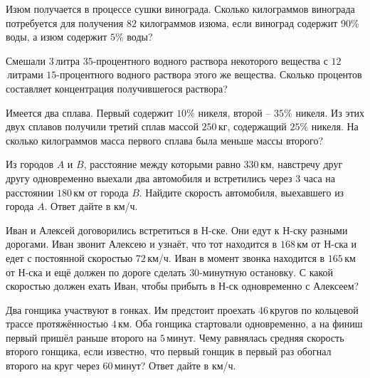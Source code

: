 	\begin{listofex}
		\item Изюм получается в процессе сушки винограда. Сколько килограммов винограда потребуется для получения \( 82 \) килограммов изюма, если виноград содержит \( 90\% \) воды, а изюм содержит \( 5\% \) воды?
		\item Смешали \( 3 \) литра \( 35 \)-процентного водного раствора некоторого вещества с \( 12 \) литрами \( 15 \)-процентного водного раствора этого же вещества. Сколько процентов составляет концентрация получившегося раствора?
		\item Имеется два сплава. Первый содержит \( 10\% \) никеля, второй -- \( 35\% \) никеля. Из этих двух сплавов получили третий сплав массой \( 250 \) кг, содержащий \( 25\% \) никеля. На сколько килограммов масса первого сплава была меньше массы второго?
		\item Из городов \( A \) и \( B \), расстояние между которыми равно \( 330 \) км, навстречу друг другу одновременно выехали два автомобиля и встретились через \( 3 \) часа на расстоянии \( 180 \) км от города \( B \). Найдите скорость автомобиля, выехавшего из города \( A \). Ответ дайте в км/ч.
		\item Иван и Алексей договорились встретиться в Н-ске. Они едут к Н-ску разными дорогами. Иван звонит Алексею и узнаёт, что тот находится в \( 168 \) км от Н-ска и едет с постоянной скоростью \( 72 \) км/ч. Иван в момент звонка находится в \( 165 \) км от Н-ска и ещё должен по дороге сделать \( 30 \)-минутную остановку. С какой скоростью должен ехать Иван, чтобы прибыть в Н-ск одновременно с Алексеем?
		\item Два гонщика участвуют в гонках. Им предстоит проехать 46 кругов по кольцевой трассе протяжённостью \( 4 \) км. Оба гонщика стартовали одновременно, а на финиш первый пришёл раньше второго на \( 5 \) минут. Чему равнялась средняя скорость второго гонщика, если известно, что первый гонщик в первый раз обогнал второго на круг через \( 60 \) минут? Ответ дайте в км/ч.
		\item 
	\end{listofex}
%
%
